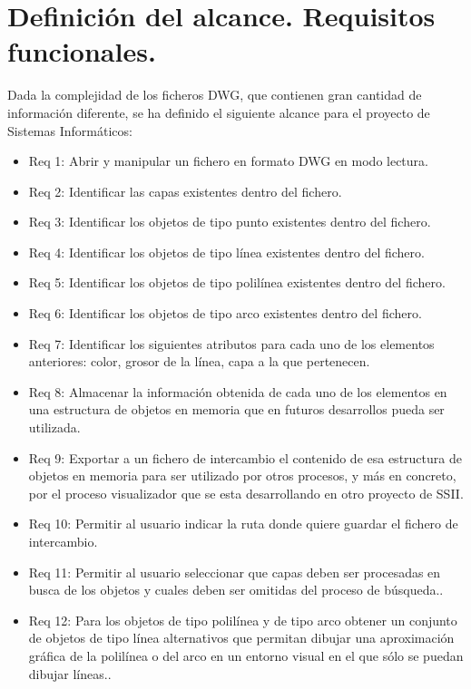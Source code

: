 \section{Definición del alcance. Requisitos funcionales.}

Dada la complejidad de los ficheros DWG, que contienen gran cantidad de información diferente, se ha definido el siguiente alcance para el proyecto de Sistemas Informáticos:


\begin{itemize}

\item{Req 1: Abrir y manipular un fichero en formato DWG en modo lectura.}
\item{Req 2: Identificar las capas existentes dentro del fichero.}
\item{Req 3: Identificar los objetos de tipo punto existentes dentro del fichero.}
\item{Req 4: Identificar los objetos de tipo línea existentes dentro del fichero.}
\item{Req 5: Identificar los objetos de tipo polilínea existentes dentro del fichero.}
\item{Req 6: Identificar los objetos de tipo arco existentes dentro del fichero.}
\item{Req 7: Identificar los siguientes atributos para cada uno de los elementos anteriores: color, grosor de la línea, capa a la que pertenecen}.
\item{Req 8: Almacenar la información obtenida de cada uno de los elementos en una estructura de objetos en memoria que en futuros desarrollos pueda ser utilizada}.
\item{Req 9: Exportar a un fichero de intercambio el contenido de esa estructura de objetos en memoria para ser utilizado por otros procesos, y más en concreto, por el proceso visualizador que se esta desarrollando en otro proyecto de SSII.}
\item{Req 10: Permitir al usuario indicar la ruta donde quiere guardar el fichero de intercambio}.
\item{Req 11: Permitir al usuario seleccionar que capas deben ser procesadas en busca de los objetos y cuales deben ser omitidas del proceso de búsqueda.}.
\item{Req 12: Para los objetos de tipo polilínea y de tipo arco obtener un conjunto de objetos de tipo línea alternativos que permitan dibujar una aproximación gráfica de la polilínea o del arco en un entorno visual en el que sólo se puedan dibujar líneas.}.

\end{itemize}
